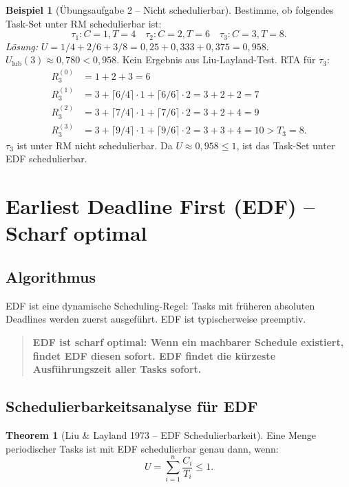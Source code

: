﻿\documentclass[a4paper,12pt]{report}
\theoremstyle{definition}
\newtheorem{beispiel}{Beispiel}[chapter]
\newtheorem{theorem}{Theorem}[chapter]
\begin{document}
\begin{beispiel}[Übungsaufgabe 2 -- Nicht schedulierbar]
	Bestimme, ob folgendes Task-Set unter RM schedulierbar ist:
	\[
		\tau_1: C=1, T=4 \quad \tau_2: C=2, T=6 \quad \tau_3: C=3, T=8.
	\]
	\textit{Lösung:} $U = 1/4 + 2/6 + 3/8 = 0{,}25 + 0{,}333 + 0{,}375 = 0{,}958$.
	$U_{\text{lub}}(3) \approx 0{,}780 < 0{,}958$. Kein Ergebnis aus Liu-Layland-Test.
	RTA für $\tau_3$:
	\begin{align*}
		R_3^{(0)} &= 1 + 2 + 3 = 6 \\
		R_3^{(1)} &= 3 + \lceil 6/4\rceil\cdot1 + \lceil 6/6\rceil\cdot2 = 3+2+2 = 7 \\
		R_3^{(2)} &= 3 + \lceil 7/4\rceil\cdot1 + \lceil 7/6\rceil\cdot2 = 3+2+4 = 9 \\
		R_3^{(3)} &= 3 + \lceil 9/4\rceil\cdot1 + \lceil 9/6\rceil\cdot2 = 3+3+4 = 10 > T_3 = 8.
	\end{align*}
	$\tau_3$ ist unter RM nicht schedulierbar. Da $U \approx 0{,}958 \leq 1$,
	ist das Task-Set unter EDF schedulierbar.
\end{beispiel}

\section{Earliest Deadline First (EDF) -- Scharf optimal}

\subsection{Algorithmus}

EDF ist eine dynamische Scheduling-Regel: Tasks mit früheren absoluten Deadlines
werden zuerst ausgeführt. EDF ist typischerweise preemptiv.

\begin{quote}
\textbf{EDF ist scharf optimal: Wenn ein machbarer Schedule existiert, findet EDF diesen sofort. EDF findet die kürzeste Ausführungszeit aller Tasks sofort.}
\end{quote}

\subsection{Schedulierbarkeitsanalyse für EDF}

\begin{theorem}[Liu \& Layland 1973 -- EDF Schedulierbarkeit]
	\label{thm:edf_schedulierbar}
	Eine Menge periodischer Tasks ist mit EDF schedulierbar genau dann, wenn:
	\[
		U = \sum_{i=1}^{n} \frac{C_i}{T_i} \leq 1.
	\]
\end{theorem}
\end{document}

